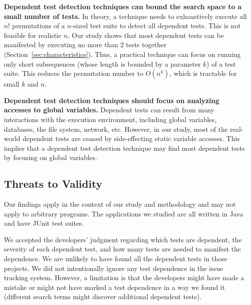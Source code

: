 \tinyrelax
\noindent \textbf{Dependent test detection techniques
can bound the search space to a small number of tests.}
In theory, a technique needs to exhaustively execute
all $n!$ permutations of a $n$-sized
test suite to detect all dependent tests. This is
not feasible for realistic $n$.  Our study shows that
most dependent tests can be manifested by executing
no more than 2 tests together (Section~\ref{sec:characteristics}).
Thus, a practical technique
can focus on running only short subsequences (whose
length is bounded by a parameter $k$)
of a test suite. This reduces the permutation number 
to $O(n^k)$, which is tractable for small $k$ and $n$.

\tinyrelax
\noindent \textbf{Dependent test detection techniques
should focus on analyzing accesses to global variables.}
Dependent tests can result from many
interactions with the execution environment, including
global variables, databases, the file system, network, etc.
However, in our study, most of the
real-world dependent tests are caused
by side-effecting static variable accesses. This implies that a dependent
test detection technique may find most dependent tests
by focusing on global variables.




\subsection{Threats to Validity}

Our findings apply in the context of our study and methodology and may not
apply to arbitrary programs.
The applications we studied are all written in 
Java and have JUnit test suites.  

We accepted the developers' judgment regarding which tests are dependent,
the severity of each dependent test, and how many tests are needed
to manifest the dependence.
We are unlikely to have found all the dependent tests in those projects. 
We did not intentionally ignore
any test dependence in the issue tracking system.
However, a limitation is that the developers might have made a mistake or
might not have marked a test dependence in a way we found it
(different search terms might discover additional dependent tests).


